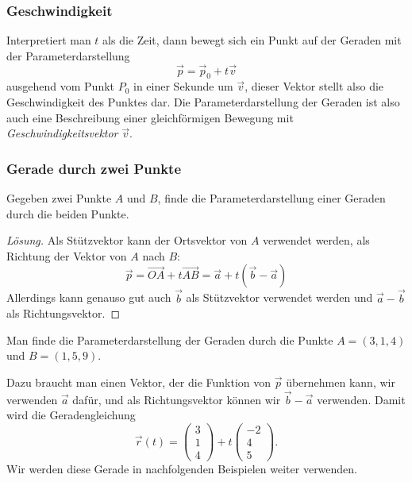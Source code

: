 \subsubsection{Geschwindigkeit}
Interpretiert man $t$ als die Zeit, dann bewegt sich ein Punkt auf der
Geraden mit der Parameterdarstellung
\[
\vec{p} = \vec{p}_0 + t \vec{v}
\]
ausgehend vom Punkt $P_0$ in einer Sekunde um $\vec v$,
dieser Vektor stellt also die Geschwindigkeit des Punktes dar.
Die Parameterdarstellung der Geraden ist also auch eine
Beschreibung einer gleichförmigen Bewegung mit {\em Geschwindigkeitsvektor}
$\vec{v}$.

\subsubsection{Gerade durch zwei Punkte}
\begin{aufgabe}
Gegeben zwei Punkte $A$ und $B$, finde die Parameterdarstellung einer
Geraden durch die beiden Punkte.
\end{aufgabe}
\begin{proof}[Lösung]
Als Stützvektor kann der Ortsvektor von $A$ verwendet werden, als Richtung
der Vektor von $A$ nach $B$:
\[
\vec{p}
=
\overrightarrow{OA} + t\overrightarrow{AB}
=
\vec{a} + t(\vec{b}-\vec{a})
\]
Allerdings kann genauso gut auch $\vec{b}$ als Stützvektor verwendet
werden und $\vec{a}-\vec{b}$ als Richtungsvektor.
\end{proof}

\begin{beispiel}
Man finde die Parameterdarstellung der Geraden durch die Punkte
$A=(3,1,4)$ und $B=(1,5,9)$.

\smallskip

{\parindent 0pt
Dazu} braucht man einen Vektor, der die Funktion von $\vec p$ übernehmen
kann, wir verwenden $\vec{a}$ dafür, und als
Richtungsvektor können wir $\vec{b}-\vec{a}$ verwenden.
Damit wird die Geradengleichung
\begin{equation}
\vec r(t) =
\begin{pmatrix}3\\1\\4 \end{pmatrix}
+t
\begin{pmatrix}-2\\4\\5\end{pmatrix}.
\label{pigerade}
\end{equation}
Wir werden diese Gerade in nachfolgenden Beispielen weiter verwenden.
\end{beispiel}


